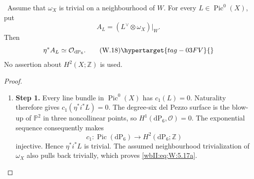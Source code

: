 \begin{proposition}
\hypertarget{tag-03IO}{}\label{wbII:prop:pic0-pullback}

\ Assume that $\omega_X$ is trivial on a neighbourhood of $W$.
For every $L\in\operatorname{Pic}^0(X)$, put
\[
 A_L=(L^\vee\otimes\omega_X)|_W.
\]
Then
\[
 \eta^*A_L\simeq\mathcal O_{\mathrm{dP}_6}.
\tag{W.18}\hypertarget{tag-03FV}{}\label{wbII:eq:W:5.17a}
\]
No assertion about $H^2(X;\mathbb Z)$ is used.
\end{proposition}



\begin{proof}
\begin{enumerate}[label={$\langle1\rangle$\arabic*.},leftmargin=*]
\item 
\noindent\textbf{Step 1.} Every line bundle in $\operatorname{Pic}^0(X)$ has $c_1(L)=0$.  Naturality
therefore gives $c_1(\eta^*i^*L)=0$.  The degree-six del Pezzo surface is the
blow-up of $\mathbb P^2$ in three noncollinear points, so
$H^1(\mathrm{dP}_6,\mathcal O)=0$.  The exponential sequence consequently
makes
\[
 c_1:\operatorname{Pic}(\mathrm{dP}_6)\longrightarrow
 H^2(\mathrm{dP}_6;\mathbb Z)
\]
injective.  Hence $\eta^*i^*L$ is trivial.  The assumed neighbourhood
trivialization of $\omega_X$ also pulls back trivially, which proves
\eqref{wbII:eq:W:5.17a}.

\end{enumerate}
\end{proof}